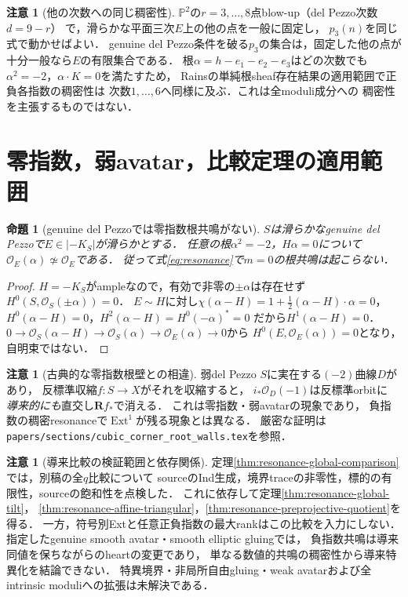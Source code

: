 \documentclass[11pt,a4paper]{ltjsarticle}
\newtheorem{proposition}[theorem]{命題}
\theoremstyle{definition}\newtheorem{remark}[theorem]{注意}
\DeclareMathOperator{\Ext}{Ext}
\begin{document}
\begin{remark}[他の次数への同じ稠密性]
$\mathbb P^2$の$r=3,\ldots,8$点blow-up（del Pezzo次数$d=9-r$）
で，滑らかな平面三次$E$上の他の点を一般に固定し，
$p_3(n)$を同じ式で動かせばよい．
genuine del Pezzo条件を破る$p_3$の集合は，固定した他の点が
十分一般なら$E$の有限集合である．
根$\alpha=h-e_1-e_2-e_3$はどの次数でも
$\alpha^2=-2$，$\alpha\cdot K=0$を満たすため，
Rainsの単純根sheaf存在結果の適用範囲で正負各指数の稠密性は
次数$1,\ldots,6$へ同様に及ぶ．これは全moduli成分への
稠密性を主張するものではない．
\end{remark}







\section{零指数，弱avatar，比較定理の適用範囲}
\begin{proposition}[genuine del Pezzoでは零指数根共鳴がない]
\label{prop:zero-index}
$S$は滑らかなgenuine del Pezzoで$E\in|-K_S|$が滑らかとする．
任意の根$\alpha^2=-2$，$H\alpha=0$について
$\mathcal O_E(\alpha)\not\simeq\mathcal O_E$である．
従って式\eqref{eq:resonance}で$m=0$の根共鳴は起こらない．
\end{proposition}
\begin{proof}
$H=-K_S$がampleなので，有効で非零の$\pm\alpha$は存在せず
$H^0(S,\mathcal O_S(\pm\alpha))=0$．
$E\sim H$に対し$\chi(\alpha-H)=
1+\frac12(\alpha-H)\cdot\alpha=0$，
$H^0(\alpha-H)=0$，$H^2(\alpha-H)=H^0(-\alpha)^*=0$
だから$H^1(\alpha-H)=0$．
$0\to\mathcal O_S(\alpha-H)\to\mathcal O_S(\alpha)
\to\mathcal O_E(\alpha)\to0$から
$H^0(E,\mathcal O_E(\alpha))=0$となり，自明束ではない．
\end{proof}
\begin{remark}[古典的な零指数根壁との相違]
弱del Pezzo $S$に実在する$(-2)$曲線$D$があり，
反標準収縮$f:S\to X$がそれを収縮すると，
$i_*\mathcal O_D(-1)$は反標準orbitに
\emph{導来的にも}直交し$\mathbf Rf_*$で消える．
これは零指数・弱avatarの現象であり，
負指数の稠密resonanceで$\Ext^1$が残る現象とは異なる．
厳密な証明は\texttt{papers/sections/cubic\_corner\_root\_walls.tex}を参照．
\end{remark}

\begin{remark}[導来比較の検証範囲と依存関係]
定理\ref{thm:resonance-global-comparison}では，別稿の全$q$比較について
sourceのInd生成，境界traceの非零性，標的の有限性，sourceの飽和性を点検した．
これに依存して定理\ref{thm:resonance-global-tilt}，
\ref{thm:resonance-affine-triangular}，\ref{thm:resonance-preprojective-quotient}を得る．
一方，符号別Extと任意正負指数の最大rankはこの比較を入力にしない．
指定したgenuine smooth avatar・smooth elliptic gluingでは，
負指数共鳴は導来同値を保ちながらのheartの変更であり，
単なる数値的共鳴の稠密性から導来特異化を結論できない．
特異境界・非局所自由gluing・weak avatarおよび全intrinsic moduliへの拡張は未解決である．
\end{remark}
\end{document}
